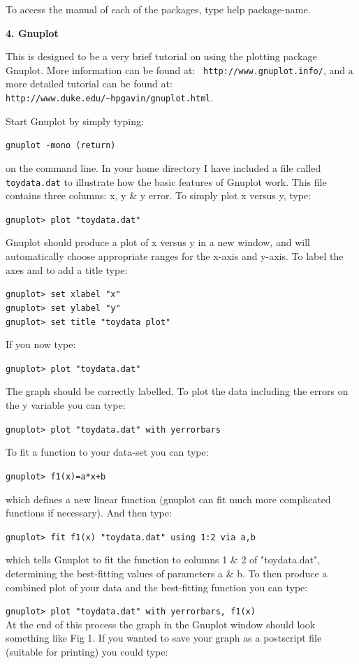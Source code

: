 \documentclass[12pt]{article}
\begin{document}
To access the manual of each of the packages, type {\sc help package-name}.

\newpage

\begin{center}
{\large{\bf 4. Gnuplot}}
\end{center}
This is designed to be a very brief tutorial on using the plotting
package Gnuplot. More information can be found at: {\tt
http://www.gnuplot.info/}, and a more detailed tutorial can be found
at: {\tt http://www.duke.edu/\textasciitilde hpgavin/gnuplot.html}.

Start Gnuplot by simply typing:

{\tt gnuplot -mono (return)}

on the command line. In your home directory I have included a file
called {\tt toydata.dat} to illustrate how the basic features of
Gnuplot work. This file contains three columns: x, y \& y error. 
To simply plot x versus y, type:

{\tt gnuplot> plot "toydata.dat"}

Gnuplot should produce a plot of x versus y in a new window, and will
automatically choose appropriate ranges for the x-axis and y-axis. To
label the axes and to add a title type:

{\tt gnuplot> set xlabel "x"}\\
{\tt gnuplot> set ylabel "y"}\\
{\tt gnuplot> set title "toydata plot"}

If you now type:

{\tt gnuplot> plot "toydata.dat"}

The graph should be correctly labelled. To plot the data including the
errors on the y variable you can type:

{\tt gnuplot> plot "toydata.dat" with yerrorbars}

To fit a function to your data-set you can type:

{\tt gnuplot> f1(x)=a*x+b}

which defines a new linear function (gnuplot can fit much more
complicated functions if necessary). And then type:

{\tt gnuplot> fit f1(x) "toydata.dat" using 1:2 via a,b}

which tells Gnuplot to fit the function to columns 1 \& 2 of
"toydata.dat", determining the best-fitting values of parameters a
\& b. To then produce a combined plot of your data and the best-fitting
function you can type:

{\tt gnuplot> plot "toydata.dat" with yerrorbars, f1(x)}\\
\newpage
At the end of this process the graph in the Gnuplot window should look
something like Fig 1. If you wanted to save your graph as a postscript
file (suitable for printing) you could type:
\end{document}
